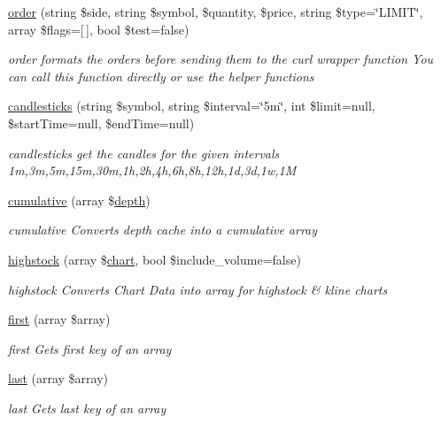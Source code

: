 \begin{DoxyCompactItemize}
\hyperlink{classBinance_1_1API_a40e8ddf7280b33b1899f59d0f16e5fa0}{order} (string \$side, string \$symbol, \$quantity, \$price, string \$type=\char`\"{}L\-I\-M\-I\-T\char`\"{}, array \$flags=\mbox{[}$\,$\mbox{]}, bool \$test=false)
\begin{DoxyCompactList}\small\item\em order formats the orders before sending them to the curl wrapper function You can call this function directly or use the helper functions \end{DoxyCompactList}\item 
\hyperlink{classBinance_1_1API_a8273c4cc5c3226aa46e5aee6a69a58aa}{candlesticks} (string \$symbol, string \$interval=\char`\"{}5m\char`\"{}, int \$limit=null, \$start\-Time=null, \$end\-Time=null)
\begin{DoxyCompactList}\small\item\em candlesticks get the candles for the given intervals 1m,3m,5m,15m,30m,1h,2h,4h,6h,8h,12h,1d,3d,1w,1\-M \end{DoxyCompactList}\item 
\hyperlink{classBinance_1_1API_a00d93784ab9eb83c3817ccaa75e9746d}{cumulative} (array \$\hyperlink{classBinance_1_1API_ac36901dbea220b2401786a6d1bc4d051}{depth})
\begin{DoxyCompactList}\small\item\em cumulative Converts depth cache into a cumulative array \end{DoxyCompactList}\item 
\hyperlink{classBinance_1_1API_a5eaa9d36db8181fc4605a3841f1106ac}{highstock} (array \$\hyperlink{classBinance_1_1API_a1e0a2985b3ff7e4e9c1155a8e46caa5c}{chart}, bool \$include\-\_\-volume=false)
\begin{DoxyCompactList}\small\item\em highstock Converts Chart Data into array for highstock \& kline charts \end{DoxyCompactList}\item 
\hyperlink{classBinance_1_1API_a53fcf31d85faa8445653f581fdbdb72c}{first} (array \$array)
\begin{DoxyCompactList}\small\item\em first Gets first key of an array \end{DoxyCompactList}\item 
\hyperlink{classBinance_1_1API_a468092e1edfd35f79954236714c825c6}{last} (array \$array)
\begin{DoxyCompactList}\small\item\em last Gets last key of an array \end{DoxyCompactList}\item 

\end{DoxyCompactItemize}

